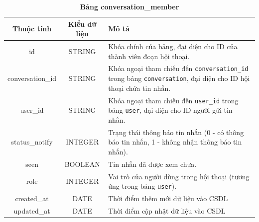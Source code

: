 \begin{table}[H]
  \caption{\bfseries \fontsize{12pt}{0pt}\selectfont Bảng conversation\_member}
  \centering
  \begin{tabularx}{0.9\textwidth}{|c|c|X|}
    \hline
    \textbf{Thuộc tính} & \textbf{Kiểu dữ liệu} & \textbf{Mô tả} \\
    \hline
    id & STRING & Khóa chính của bảng, đại diện cho ID của thành viên đoạn hội thoại. \\
    \hline
    conversation\_id & STRING & Khóa ngoại tham chiếu đến \texttt{conversation\_id} trong bảng \texttt{conversation}, đại diện cho ID hội thoại chứa tin nhắn. \\
    \hline
    user\_id & STRING & Khóa ngoại tham chiếu đến \texttt{user\_id} trong bảng \texttt{user}, đại diện cho ID người gửi tin nhắn. \\
    \hline
    status\_notify & INTEGER & Trạng thái thông báo tin nhắn (0 - có thông báo tin nhắn, 1 - không nhận thông báo tin nhắn).\\
    \hline
    seen & BOOLEAN & Tin nhắn đã được xem chưa.\\
    \hline
    role & INTEGER & Vai trò của người dùng trong hội thoại (tương ứng trong bảng \texttt{user}).\\
    \hline
    created\_at & DATE & Thời điểm thêm mới dữ liệu vào CSDL \\
    \hline
    updated\_at & DATE & Thời điểm cập nhật dữ liệu vào CSDL \\
    \hline
  \end{tabularx}
\end{table}


